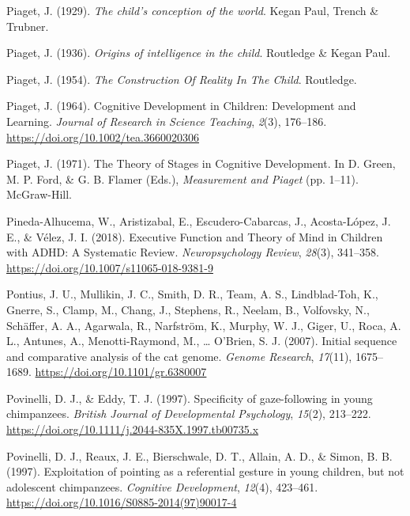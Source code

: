 \documentclass[
]{scrbook}
\newlength{\cslhangindent}
\newenvironment{CSLReferences}[2] %
 {\begin{list}{}{%
  \setlength{\itemindent}{0pt}
  \setlength{\leftmargin}{0pt}
  \setlength{\parsep}{0pt}
  \ifodd #1
   \setlength{\leftmargin}{\cslhangindent}
   \setlength{\itemindent}{-1\cslhangindent}
  \fi
  \setlength{\itemsep}{#2\baselineskip}}}
 {\end{list}}
\begin{document}
\begin{CSLReferences}{1}{0}
Piaget, J. (1929). \emph{The child's conception of the world}. Kegan Paul, Trench \& Trubner.

Piaget, J. (1936). \emph{Origins of intelligence in the child}. Routledge \& Kegan Paul.

Piaget, J. (1954). \emph{The {Construction Of Reality In The Child}}. Routledge.

Piaget, J. (1964). Cognitive {Development} in {Children}: {Development} and {Learning}. \emph{Journal of Research in Science Teaching}, \emph{2}(3), 176--186. \url{https://doi.org/10.1002/tea.3660020306}

Piaget, J. (1971). The {Theory} of {Stages} in {Cognitive Development}. In D. Green, M. P. Ford, \& G. B. Flamer (Eds.), \emph{Measurement and {Piaget}} (pp. 1--11). McGraw-Hill.

Pineda-Alhucema, W., Aristizabal, E., Escudero-Cabarcas, J., Acosta-López, J. E., \& Vélez, J. I. (2018). Executive {Function} and {Theory} of {Mind} in {Children} with {ADHD}: A {Systematic Review}. \emph{Neuropsychology Review}, \emph{28}(3), 341--358. \url{https://doi.org/10.1007/s11065-018-9381-9}

Pontius, J. U., Mullikin, J. C., Smith, D. R., Team, A. S., Lindblad-Toh, K., Gnerre, S., Clamp, M., Chang, J., Stephens, R., Neelam, B., Volfovsky, N., Schäffer, A. A., Agarwala, R., Narfström, K., Murphy, W. J., Giger, U., Roca, A. L., Antunes, A., Menotti-Raymond, M., \ldots{} O'Brien, S. J. (2007). Initial sequence and comparative analysis of the cat genome. \emph{Genome Research}, \emph{17}(11), 1675--1689. \url{https://doi.org/10.1101/gr.6380007}

Povinelli, D. J., \& Eddy, T. J. (1997). Specificity of gaze-following in young chimpanzees. \emph{British Journal of Developmental Psychology}, \emph{15}(2), 213--222. \url{https://doi.org/10.1111/j.2044-835X.1997.tb00735.x}

Povinelli, D. J., Reaux, J. E., Bierschwale, D. T., Allain, A. D., \& Simon, B. B. (1997). Exploitation of pointing as a referential gesture in young children, but not adolescent chimpanzees. \emph{Cognitive Development}, \emph{12}(4), 423--461. \url{https://doi.org/10.1016/S0885-2014(97)90017-4}


\end{CSLReferences}
\end{document}
